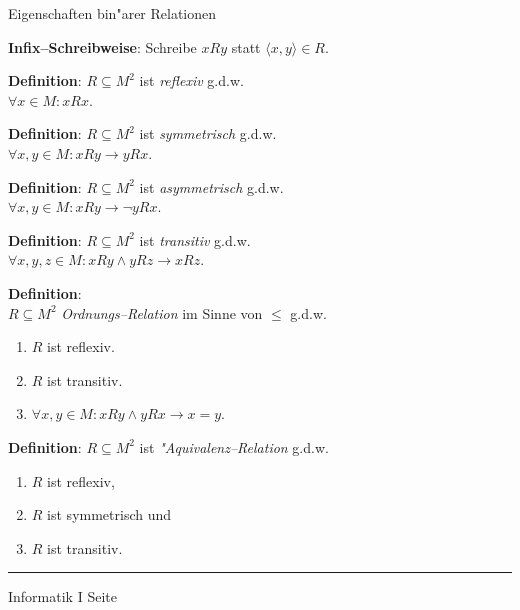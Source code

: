 
\begin{slide}{}
\normalsize
\begin{center}
  Eigenschaften bin"arer Relationen
\end{center}

\footnotesize
\textbf{Infix--Schreibweise}: Schreibe $x R y$ statt $\langle x, y \rangle \in R$.

\textbf{Definition}:  $R \subseteq M^2$ ist \emph{reflexiv} g.d.w. \\[0.3cm]
\hspace*{1.3cm} $\forall x \in M: x R x$.

\textbf{Definition}:  $R \subseteq M^2$ ist \emph{symmetrisch} g.d.w. \\[0.3cm]
\hspace*{1.3cm}  $\forall x, y \in M: x R y \rightarrow  y R x$. 

\textbf{Definition}:  $R \subseteq M^2$ ist \emph{asymmetrisch} g.d.w. \\[0.3cm]
\hspace*{1.3cm}  $\forall x, y \in M: x R y \rightarrow \neg y R x$. 

\textbf{Definition}:  $R \subseteq M^2$ ist \emph{transitiv} g.d.w. \\[0.3cm]
\hspace*{0.3cm} $\forall x, y, z \in M: x R y \wedge y R z \rightarrow x R z$. 

\textbf{Definition}: \\
 $R \subseteq M^2$  \emph{Ordnungs--Relation} im Sinne von $\leq$ g.d.w. 
\begin{enumerate}
\item $R$ ist reflexiv.
\item $R$ ist transitiv.
\item $\forall x, y \in M: x R y \wedge y R x \rightarrow x = y$. 
\end{enumerate}

\textbf{Definition}:  $R \subseteq M^2$ ist \emph{"Aquivalenz--Relation} g.d.w. 
\begin{enumerate}
\item $R$ ist reflexiv,
\item $R$ ist symmetrisch und
\item $R$ ist transitiv.
\end{enumerate}

\vspace*{\fill}
\tiny \addtocounter{mypage}{1}
\rule{15cm}{1mm}
Informatik I  \hspace*{\fill} Seite 
\end{slide}

